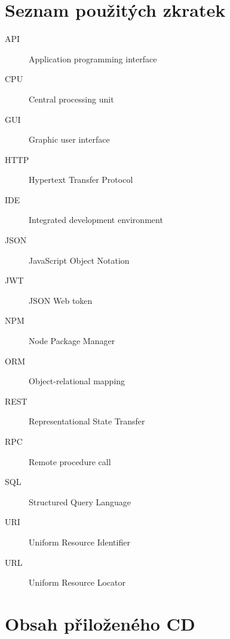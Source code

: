 \documentclass[thesis=M,czech]{FITthesis}[2019/12/23]
\begin{document}
\chapter{Seznam použitých zkratek}
\begin{description}
	\item[API] Application programming interface
	\item[CPU] Central processing unit
	\item[GUI] Graphic user interface
	\item[HTTP] Hypertext Transfer Protocol
	\item[IDE] Integrated development environment
	\item[JSON] JavaScript Object Notation
	\item[JWT] JSON Web token
	\item[NPM] Node Package Manager
	\item[ORM] Object-relational mapping
	\item[REST] Representational State Transfer
	\item[RPC] Remote procedure call
	\item[SQL] Structured Query Language
	\item[URI] Uniform Resource Identifier
	\item[URL] Uniform Resource Locator  
\end{description} 

\chapter{Obsah přiloženého CD}

\begin{figure}
\end{figure}
\end{document}
